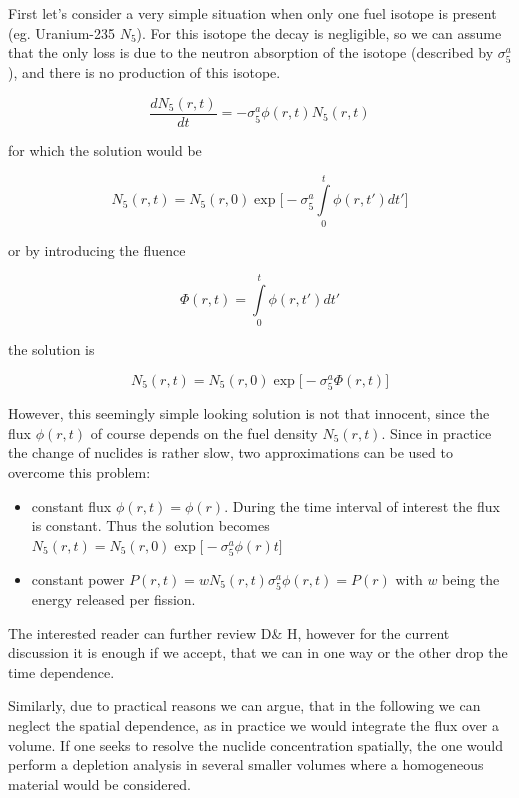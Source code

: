 First let's consider a very simple situation when only one fuel isotope is present (eg. Uranium-235 $N_5$). For this isotope the decay is negligible, so we can assume that the only loss is due to the neutron absorption of  the isotope (described by $\sigma_5^a$), and there is no production of this isotope.

\begin{equation}
\frac{dN_5(r,t)}{dt}=-\sigma_5^a\phi(r,t)N_5(r,t)
\end{equation}

for which the solution would be 

\begin{equation}
N_5(r,t)=N_5(r,0)\exp\Big[-\sigma_5^a\int\limits_0^t\phi(r,t')dt'\Big]
\end{equation}

or by introducing the fluence

\begin{equation}\label{eq:fluence}
\Phi(r,t)=\int\limits_0^t\phi(r,t')dt'
\end{equation}

the solution is

\begin{equation}
N_5(r,t)=N_5(r,0)\exp\Big[-\sigma_5^a\Phi(r,t)\Big]
\end{equation}

However, this seemingly simple looking solution is not that innocent, since the flux $\phi(r,t)$ of course depends on the fuel density $N_5(r,t)$. Since in practice the change of nuclides is rather slow, two approximations can be used to overcome this problem:

\begin{itemize}
\item constant flux $\phi(r,t)=\phi(r)$. During the time interval of interest the flux is constant. Thus the solution becomes \newline $N_5(r,t)=N_5(r,0)\exp\Big[-\sigma_5^a\phi(r)t\Big]$
\item constant power $P(r,t)=wN_5(r,t)\sigma_5^a\phi(r,t)=P(r)$ with $w$ being the energy released per fission. 
\end{itemize}

The interested reader can further review D\& H, however for the current discussion it is enough if we accept, that we can in one way or the other drop the time dependence. 

Similarly, due to practical reasons we can argue, that in the following we can neglect the spatial dependence, as in practice we would integrate the flux over a volume. If one seeks to resolve the nuclide concentration spatially, the one would perform a depletion analysis in several smaller volumes where a homogeneous material would be considered. 



